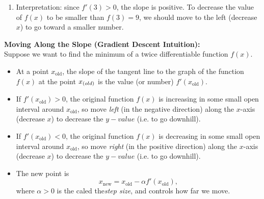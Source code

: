 \documentclass[11pt]{article}
\begin{document}
\begin{minipage}[c]{0.63\textwidth}
\begin{enumerate}
\item Interpretation: since $f'(3) > 0$, the slope is positive. To decrease the value of $f(x)$ to be smaller than $f(3) = 9$, we should move to the left (decrease $x$) to go toward a smaller number. 
\end{enumerate}
\medskip
\begin{center}
\end{center}
\end{minipage}
\newpage
\textbf{Moving Along the Slope (Gradient Descent Intuition):} \\
Suppose we want to find the minimum of a twice differentiable function $f(x)$.
\begin{itemize}
    \item At a point $x_{\text{old}}$, the slope of the tangent line to the graph of the function $f(x)$ at the point $x_{\text(old)}$ is the value (or number) $f'(x_{\text{old}})$.
    \item If $f'(x_{\text{old}}) > 0$, the original function $f(x)$ is increasing in some small open interval around $x_{\text{old}}$, so move \emph{left} (in the negative direction) along the $x$-axis (decrease $x$) to decrease the $y-value$ (i.e. to go downhill).
    \item If $f'(x_{\text{old}}) < 0$, the original function $f(x)$ is decreasing in some small open interval around $x_{\text{old}}$, so move \emph{right} (in the positive direction) along the $x$-axis (decrease $x$) to decrease the $y-value$ (i.e. to go downhill).
    \item The new point is
    \[
    x_{\text{new}} = x_{\text{old}} - \alpha f'(x_{\text{old}}),
    \]
    where $\alpha>0$ is the caled the\emph{step size}, and controls how far we move.
\end{itemize}
\end{document}
